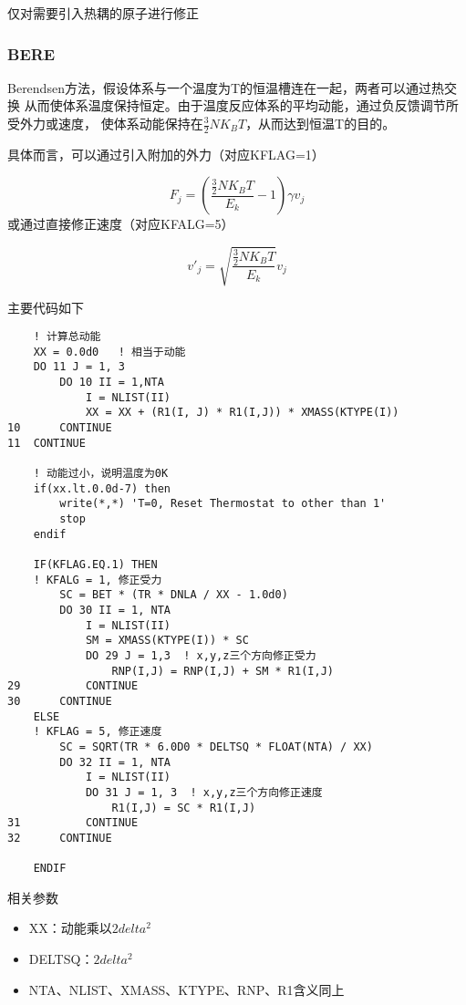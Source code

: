\documentclass[UTF-8]{ctexart}
\begin{document}
仅对需要引入热耦的原子进行修正

\subsubsection{BERE}

Berendsen方法，假设体系与一个温度为T的恒温槽连在一起，两者可以通过热交换
从而使体系温度保持恒定。由于温度反应体系的平均动能，通过负反馈调节所受外力或速度，
使体系动能保持在$\frac{3}{2}NK_BT$，从而达到恒温T的目的。

具体而言，可以通过引入附加的外力（对应KFLAG=1）

\begin{equation}
    F_j = (\frac{\frac{3}{2}NK_BT}{E_k} - 1)\gamma v_j
\end{equation}
或通过直接修正速度（对应KFALG=5）

\begin{equation}
    v'_{j} = \sqrt{\frac{\frac{3}{2}NK_BT}{E_k}}v_j
\end{equation}

主要代码如下
\begin{verbatim}
    ! 计算总动能
    XX = 0.0d0   ! 相当于动能
    DO 11 J = 1, 3
        DO 10 II = 1,NTA
            I = NLIST(II)
            XX = XX + (R1(I, J) * R1(I,J)) * XMASS(KTYPE(I))
10      CONTINUE
11  CONTINUE

    ! 动能过小，说明温度为0K
    if(xx.lt.0.0d-7) then
        write(*,*) 'T=0, Reset Thermostat to other than 1'
        stop
    endif  

    IF(KFLAG.EQ.1) THEN
    ! KFALG = 1, 修正受力
        SC = BET * (TR * DNLA / XX - 1.0d0)
        DO 30 II = 1, NTA
            I = NLIST(II)
            SM = XMASS(KTYPE(I)) * SC
            DO 29 J = 1,3  ! x,y,z三个方向修正受力
                RNP(I,J) = RNP(I,J) + SM * R1(I,J)
29          CONTINUE
30      CONTINUE
    ELSE
    ! KFLAG = 5, 修正速度
        SC = SQRT(TR * 6.0D0 * DELTSQ * FLOAT(NTA) / XX)
        DO 32 II = 1, NTA
            I = NLIST(II)
            DO 31 J = 1, 3  ! x,y,z三个方向修正速度
                R1(I,J) = SC * R1(I,J)
31          CONTINUE
32      CONTINUE

    ENDIF
\end{verbatim}

\noindent
相关参数

\begin{itemize}
    \item XX：动能乘以$2 delta^2$
    \item DELTSQ：$2 delta^2$
    \item NTA、NLIST、XMASS、KTYPE、RNP、R1含义同上
\end{itemize}
\end{document}
